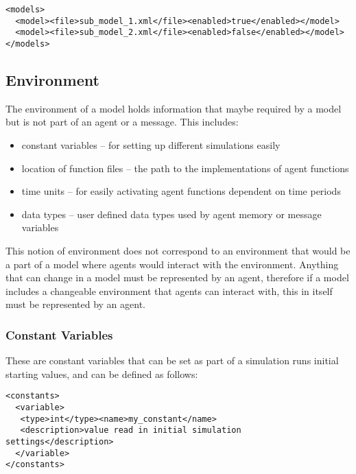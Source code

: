 \begin{mylisting}
\begin{verbatim}
<models>
  <model><file>sub_model_1.xml</file><enabled>true</enabled></model>
  <model><file>sub_model_2.xml</file><enabled>false</enabled></model>
</models>
\end{verbatim}
\end{mylisting}

\subsection{Environment}

The environment of a model holds information that maybe required by a model but
is not part of an agent or a message. This includes:

\begin{itemize}
\item constant variables -- for setting up different simulations easily
\item location of function files -- the path to the implementations of agent
functions
\item time units -- for easily activating agent functions dependent on time
periods
\item data types -- user defined data types used by agent memory or
message variables
\end{itemize}

This notion of environment does not correspond to an environment that would be
a part of a model where agents would interact with the environment. Anything
that can change in a model must be represented by an agent, therefore if a
model includes a changeable environment that agents can interact with, this in
itself must be represented by an agent.

\subsubsection{Constant Variables}

These are constant variables that can be set as part of a simulation runs
initial starting values, and can be defined as follows:

\begin{mylisting}
\begin{verbatim}
<constants>
  <variable>
   <type>int</type><name>my_constant</name>
   <description>value read in initial simulation settings</description>
  </variable>
</constants>
\end{verbatim}
\end{mylisting}

